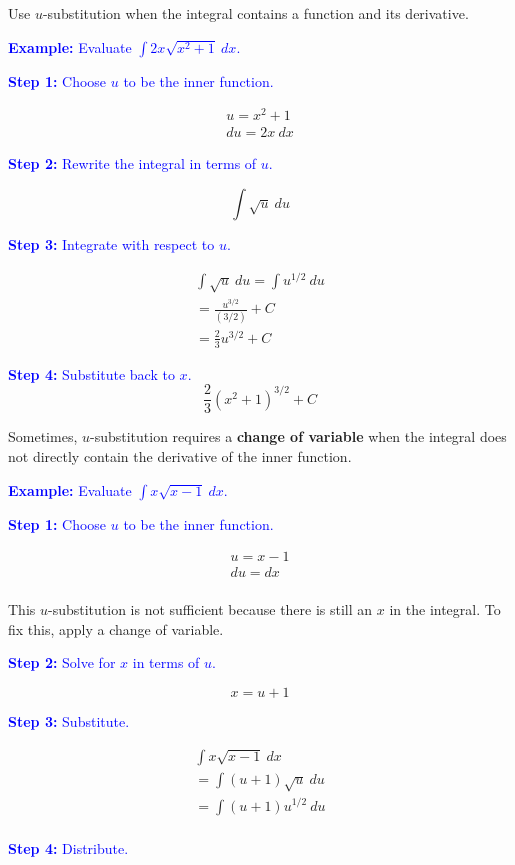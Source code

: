\documentclass[letterpaper, 12pt]{article}
\newcommand{\example}[1]{\textcolor{blue}{\textbf{Example:} #1}}
\newcommand{\step}[2]{\textcolor{blue}{\textbf{Step #1:} #2}}
\begin{document}
Use $u$-substitution when the integral contains a function and its derivative.

\example{Evaluate $\displaystyle \int 2x \sqrt{x^2 + 1} \: dx$.}

\step{1}{Choose $u$ to be the inner function.}

\begin{gather*}
u = x^2 + 1 \\
du = 2x \: dx
\end{gather*}

\step{2}{Rewrite the integral in terms of $u$.}

$$\int \sqrt{u} \: du$$

\step{3}{Integrate with respect to $u$.}

\begin{gather*}
\int \sqrt{u} \: du = \int u^{1/2} \: du \\
= \frac{u^{3/2}}{(3/2)} + C \\
= \frac{2}{3} u^{3/2} + C
\end{gather*}

\step{4}{Substitute back to $x$.}
$$\boxed{\frac{2}{3} (x^2 + 1)^{3/2} + C}$$

Sometimes, $u$-substitution requires a \textbf{change of variable} when the integral does not directly contain the derivative of the inner function.

\example{Evaluate $\displaystyle \int x\sqrt{x-1} \: dx$.}

\step{1}{Choose $u$ to be the inner function.}

\begin{gather*}
u = x - 1 \\
du = dx \\
\end{gather*}

This $u$-substitution is not sufficient because there is still an $x$ in the integral. To fix this, apply a change of variable.

\step{2}{Solve for $x$ in terms of $u$.}

$$ x = u + 1 $$

\step{3}{Substitute.}

\begin{gather*}
\int x\sqrt{x-1} \: dx \\
= \int (u + 1) \sqrt{u} \: du \\
= \int (u + 1) u^{1/2} \: du \\
\end{gather*}

\step{4}{Distribute.}
\end{document}
